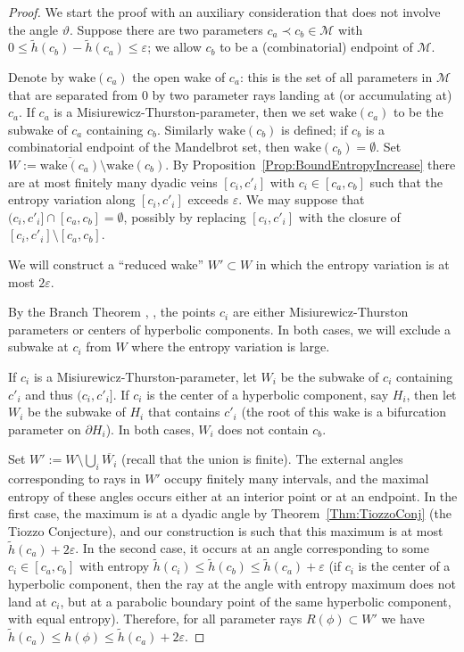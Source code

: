 \documentclass[12pt]{amsart}
\newcommand{\M}{\mathscr M}
\newcommand{\sm}{\setminus}
\newcommand{\0}{\texttt{0}}
\newcommand{\1}{\texttt{1}}
\newcommand\eps{\varepsilon}
\theoremstyle{definition}
\numberwithin{equation}{section}
\renewcommand{\theta}{\vartheta}
\newcommand{\ovl}[1]{\overline{#1}}
\begin{document}
\begin{proof}
We start the proof with an auxiliary consideration that does not involve the angle $\theta$. Suppose there are two parameters $c_a\prec c_b\in\M$ with $0\le \tilde h(c_b)-\tilde h(c_a)\le\eps$; we allow $c_b$ to be a (combinatorial)  endpoint of $\M$.

Denote by $\text{wake}(c_a)$ the open wake of $c_a$: this is the set of all parameters in $\M$ that are separated from $0$ by two parameter rays landing at (or accumulating at) $c_a$. If $c_a$ is a Misiurewicz-Thurston-parameter, then we set $\text{wake}(c_a)$ to be the subwake of $c_a$ containing $c_b$. Similarly $\text{wake}(c_b)$ is defined; if $c_b$ is a combinatorial endpoint of the Mandelbrot set, then $\text{wake}(c_b)=\emptyset$. Set $W:=\ovl{\text{wake}(c_a)}\sm\text{wake}(c_b)$. By Proposition~\ref{Prop:BoundEntropyIncrease} there are at most finitely many dyadic veins $[c_i,c'_i]$ with $c_i\in [c_a,c_b]$ such that the entropy variation along $[c_i,c'_i]$ exceeds $\eps$. We may suppose that $(c_i,c'_i]\cap [c_a,c_b]=\emptyset$, possibly by replacing $[c_i,c'_i]$ with the closure of $[c_i,c'_i]\sm[c_a,c_b]$.

We will construct a ``reduced wake'' $W'\subset W$ in which the entropy variation is at most $2\eps$. 

By the Branch Theorem \cite{Orsay}, \cite[Theorem~3.1]{MandelBranch}, the points $c_i$ are either Misiurewicz-Thurston parameters or centers of hyperbolic components. In both cases, we will exclude a subwake at $c_i$ from $W$ where the entropy variation is large.
 
If $c_i$ is a Misiurewicz-Thurston-parameter, let $W_i$ be the subwake of $c_i$ containing $c'_i$ and thus $(c_i,c'_i]$. If $c_i$ is the center of a hyperbolic component, say $H_i$, then let $W_i$ be the subwake of $H_i$ that contains $c'_i$ (the root of this wake is a bifurcation parameter on $\partial H_i$).  In both cases, $W_i$ does not contain $c_b$.

Set $W':=W\sm \bigcup_i \ovl{W_i}$ {(recall that the union is finite)}. The external angles corresponding to rays in $W'$ occupy finitely many intervals, and the maximal entropy of these angles occurs either at an interior point or at an endpoint. In the first case, the maximum is at a dyadic angle by Theorem~\ref{Thm:TiozzoConj} (the Tiozzo Conjecture), and our construction is such that this maximum is at most $\tilde h(c_a)+2\eps$. In the second case, it occurs at an angle corresponding to some $c_i\in[c_a,c_b]$ with entropy $\tilde h(c_i)\le \tilde h(c_b)\le \tilde h(c_a)+\eps$
(if $c_i$ is the center of a hyperbolic component, then the ray at the angle with entropy maximum does not land at $c_i$, but at a parabolic boundary point of the same hyperbolic component, with equal entropy).
Therefore, for all parameter rays $R(\phi)\subset W'$ we have $\tilde h(c_a)\le h(\phi)\le \tilde h(c_a)+2\eps$.


\end{proof}
\end{document}

